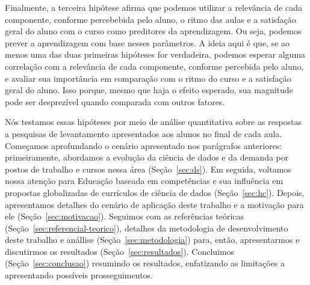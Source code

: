 Finalmente, a terceira hipótese afirma que podemos utilizar a relevância de cada componente, conforme percebebida pelo aluno, o ritmo das aulas e a satisfação geral do aluno com o curso como preditores da aprendizagem.
Ou seja, podemos prever a aprendizagem com base nesses parâmetros.
A ideia aqui é que, se ao menos uma das duas primeiras hipóteses for verdadeira, podemos esperar alguma correlação com a relevância de cada componente, conforme percebida pelo aluno, e avaliar sua importância em comparação com o ritmo do curso e a satisfação geral do aluno.
Isso porque, mesmo que haja o efeito esperado, sua magnitude pode ser desprezível quando comparada com outros fatores.

Nós testamos essas hipóteses por meio de análise quantitativa sobre as respostas a pesquisas de levantamento apresentados aos alunos no final de cada aula.
Começamos aprofundando o cenário apresentado nos parágrafos anteriores: primeiramente, abordamos a evolução da ciência de dados e da demanda por postos de trabalho e cursos nessa área (Seção~\ref{sec:ds}).
Em seguida, voltamos nossa atenção para Educação baseada em competências e sua influência em propostas globalizadas de currículos de ciência de dados (Seção~\ref{sec:hc}).
Depois, apresentamos detalhes do cenário de aplicação deste trabalho e a motivação para ele (Seção~\ref{sec:motivacao}).
Seguimos com as referências teóricas (Seção~\ref{sec:referencial-teorico}), detalhes da metodologia de desenvolvimento deste trabalho e anállise (Seção~\ref{sec:metodologia}) para, então, apresentarmos e discutirmos os resultados (Seção~\ref{sec:resultados}).
Concluimos (Seção~\ref{sec:conclusao}) resumindo os resultados, enfatizando as limitações a apresentando possíveis prosseguimentos.